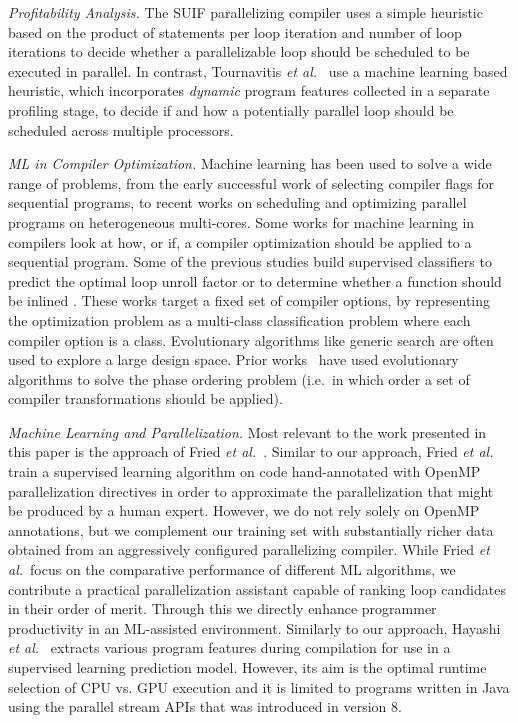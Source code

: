 \textit{Profitability Analysis.}
The SUIF \cite{Wilson:1994:SIR:193209.193217} parallelizing compiler uses a simple heuristic based on the product of statements per loop iteration and number of loop iterations to decide whether a parallelizable loop should be scheduled to be executed in parallel. In contrast, Tournavitis \emph{et al.}~\cite{Tournavitis:2009:THA:1542476.1542496} use a machine learning based heuristic, which incorporates \textit{dynamic} program features collected in a separate profiling stage, to decide if and how a potentially parallel loop should be scheduled across multiple processors.

\textit{ML in Compiler Optimization.}
Machine learning has been used to solve a wide range of problems, from the early successful work of selecting compiler flags for sequential programs, to recent works on scheduling and optimizing parallel programs on heterogeneous multi-cores. Some works for machine learning in compilers look at how, or if, a compiler optimization should be applied to a sequential program. Some of the previous studies build supervised classifiers to predict the optimal loop unroll factor \cite{4907653,1402082} or to determine whether a function should be inlined \cite{Zhao2003ToIO,1559966}. These works target a fixed set of compiler options, by representing the optimization problem as a multi-class classification problem where each compiler option is a class. Evolutionary algorithms like generic search are often used to explore a large design space. Prior works~\cite{Almagor:2004:FEC:997163.997196,Cooper:2005:AAC:1065910.1065921,Ashouri:2017:MMC:3132652.3124452} have used evolutionary algorithms to solve the phase ordering problem (i.e.\ in which order a set of compiler transformations should be applied).

\textit{Machine Learning and Parallelization.}
Most relevant to the work presented in this paper is the approach of Fried \emph{et al.}~\cite{fried_ea:2013:icmla}. Similar to our approach, Fried \emph{et al.} train a supervised learning algorithm on code hand-annotated with OpenMP parallelization directives in order to approximate the parallelization that might be produced by a human expert. However, we do not rely solely on OpenMP annotations, but we complement our training set with substantially richer data obtained from an aggressively configured parallelizing compiler. While Fried \emph{et al.}~focus on the comparative performance of different ML algorithms, we contribute a practical parallelization assistant capable of ranking loop candidates in their order of merit. Through this we directly enhance programmer productivity in an ML-assisted environment. Similarly to our approach, Hayashi \emph{et al.}~\cite{Hayashi:2015:MPH:2807426.2807429} extracts various program features during compilation for use in a supervised learning prediction model. However, its aim is the optimal runtime selection of CPU vs. GPU execution and it is limited to programs written in Java using the parallel stream APIs that was introduced in version 8.

